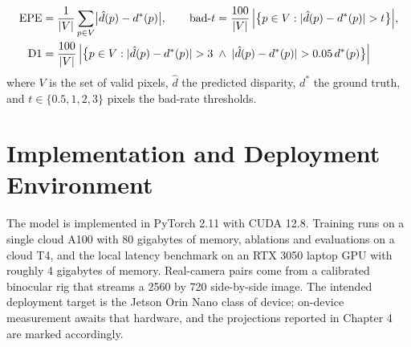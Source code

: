 \begin{equation}
\begin{aligned}
\mathrm{EPE} &= \frac{1}{\lvert V \rvert} \sum_{p \in V}
  \bigl\lvert \hat{d}(p) - d^{*}(p) \bigr\rvert, \qquad
\mathrm{bad}\text{-}t = \frac{100}{\lvert V \rvert}\,
  \Bigl\lvert \bigl\{ p \in V :
  \lvert \hat{d}(p) - d^{*}(p) \rvert > t \bigr\} \Bigr\rvert,\\
\mathrm{D1} &= \frac{100}{\lvert V \rvert}\, \Bigl\lvert \bigl\{ p \in V :
  \lvert \hat{d}(p) - d^{*}(p) \rvert > 3 \;\wedge\;
  \lvert \hat{d}(p) - d^{*}(p) \rvert > 0.05\, d^{*}(p) \bigr\} \Bigr\rvert
\end{aligned}
\label{eq:metrics}
\end{equation}
where $V$ is the set of valid pixels, $\hat{d}$ the predicted disparity,
$d^{*}$ the ground truth, and $t \in \{0.5, 1, 2, 3\}$ pixels the bad-rate
thresholds.

\section{Implementation and Deployment Environment}
The model is implemented in PyTorch 2.11 with CUDA 12.8. Training runs on
a single cloud A100 with 80 gigabytes of memory, ablations and evaluations
on a cloud T4, and the local latency benchmark on an RTX 3050 laptop GPU
with roughly 4 gigabytes of memory. Real-camera pairs come from a
calibrated binocular rig that streams a 2560 by 720 side-by-side image.
The intended deployment target is the Jetson Orin Nano class of device;
on-device measurement awaits that hardware, and the projections reported
in Chapter 4 are marked accordingly.
